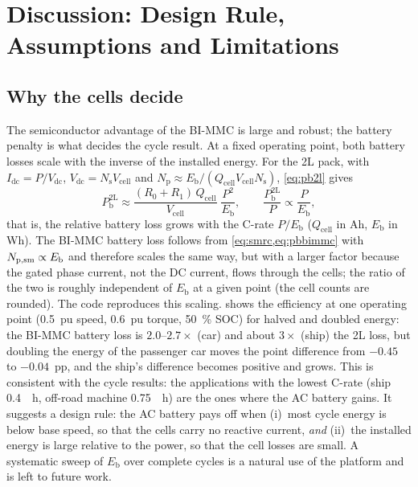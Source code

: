 \section{Discussion: Design Rule, Assumptions and Limitations}\label{sec:discussion}
\subsection{Why the cells decide}
The semiconductor advantage of the BI-MMC is large and robust; the battery penalty is what decides the cycle result. At a fixed operating point, both battery losses scale with the inverse of the installed energy. For the 2L pack, with $I_\mathrm{dc}=P/V_\mathrm{dc}$, $V_\mathrm{dc}=N_\mathrm{s}V_\mathrm{cell}$ and $N_\mathrm{p}\approx E_\mathrm{b}/(Q_\mathrm{cell}V_\mathrm{cell}N_\mathrm{s})$, \cref{eq:pb2l} gives
\begin{equation}
P_\mathrm{b}^\mathrm{2L}\approx\frac{(R_0+R_1)\,Q_\mathrm{cell}}{V_\mathrm{cell}}\;\frac{P^2}{E_\mathrm{b}},\qquad \frac{P_\mathrm{b}^\mathrm{2L}}{P}\propto\frac{P}{E_\mathrm{b}},
\label{eq:crate}
\end{equation}
that is, the relative battery loss grows with the C-rate $P/E_\mathrm{b}$ ($Q_\mathrm{cell}$ in Ah, $E_\mathrm{b}$ in Wh). The BI-MMC battery loss follows from \cref{eq:smrc,eq:pbbimmc} with $N_\mathrm{p,sm}\propto E_\mathrm{b}$ and therefore scales the same way, but with a larger factor because the gated phase current, not the DC current, flows through the cells; the ratio of the two is roughly independent of $E_\mathrm{b}$ at a given point (the cell counts are rounded). The code reproduces this scaling.  shows the efficiency at one operating point (\SI{0.5}{pu} speed, \SI{0.6}{pu} torque, \SI{50}{\percent} SOC) for halved and doubled energy: the BI-MMC battery loss is $2.0$--$2.7\times$ (car) and about $3\times$ (ship) the 2L loss, but doubling the energy of the passenger car moves the point difference from $-0.45$ to $-0.04$~pp, and the ship's difference becomes positive and grows. This is consistent with the cycle results: the applications with the lowest C-rate (ship \SI{0.4}{\per\hour}, off-road machine \SI{0.75}{\per\hour}) are the ones where the AC battery gains. It suggests a design rule: the AC battery pays off when (i)~most cycle energy is below base speed, so that the cells carry no reactive current, \emph{and} (ii)~the installed energy is large relative to the power, so that the cell losses are small. A systematic sweep of $E_\mathrm{b}$ over complete cycles is a natural use of the platform and is left to future work.


